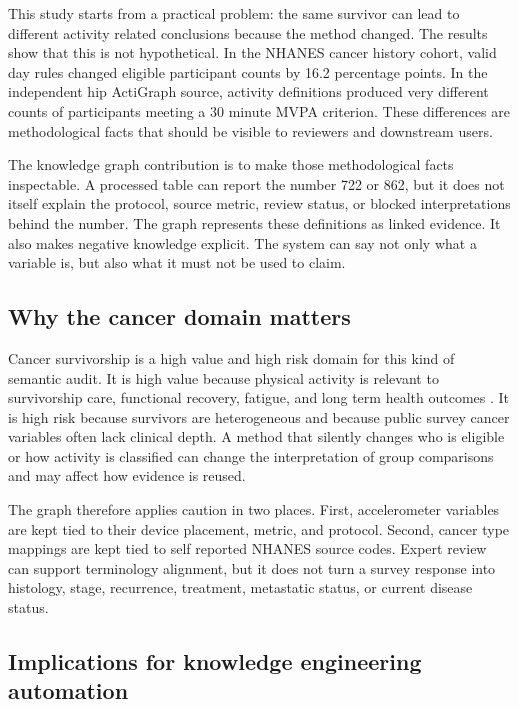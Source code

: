 \documentclass[final,5p,times,twocolumn]{elsarticle}
\begin{document}
This study starts from a practical problem: the same survivor can lead to different activity related conclusions because the method changed. The results show that this is not hypothetical. In the NHANES cancer history cohort, valid day rules changed eligible participant counts by 16.2 percentage points. In the independent hip ActiGraph source, activity definitions produced very different counts of participants meeting a 30 minute MVPA criterion. These differences are methodological facts that should be visible to reviewers and downstream users.

The knowledge graph contribution is to make those methodological facts inspectable. A processed table can report the number 722 or 862, but it does not itself explain the protocol, source metric, review status, or blocked interpretations behind the number. The graph represents these definitions as linked evidence. It also makes negative knowledge explicit. The system can say not only what a variable is, but also what it must not be used to claim.

\subsection{Why the cancer domain matters}

Cancer survivorship is a high value and high risk domain for this kind of semantic audit. It is high value because physical activity is relevant to survivorship care, functional recovery, fatigue, and long term health outcomes \cite{rock2022acs,schmitz2019exercise}. It is high risk because survivors are heterogeneous and because public survey cancer variables often lack clinical depth. A method that silently changes who is eligible or how activity is classified can change the interpretation of group comparisons and may affect how evidence is reused.

The graph therefore applies caution in two places. First, accelerometer variables are kept tied to their device placement, metric, and protocol. Second, cancer type mappings are kept tied to self reported NHANES source codes. Expert review can support terminology alignment, but it does not turn a survey response into histology, stage, recurrence, treatment, metastatic status, or current disease status.

\subsection{Implications for knowledge engineering automation}
\end{document}
